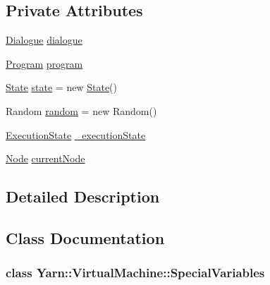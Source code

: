 \subsection*{Private Attributes}
\begin{DoxyCompactItemize}
\item 
\hyperlink{a00072}{Dialogue} \hyperlink{a00138_ac506426c503da5f033247c29e11c5e82}{dialogue}
\item 
\hyperlink{a00126}{Program} \hyperlink{a00138_a2695dbfe3d9df7ffa3f13ad2231217fb}{program}
\item 
\hyperlink{a00141}{State} \hyperlink{a00138_a70f2ce6201cdd2430ceaa764ac614ca0}{state} = new \hyperlink{a00141}{State}()
\item 
Random \hyperlink{a00138_a408485a00c7cc558428c86ed9dd04fca}{random} = new Random()
\item 
\hyperlink{a00138_add28fa9c8a45ca579e84d05920bbc42d}{Execution\-State} \hyperlink{a00138_a0ae362616d85f028b7ec3230388926f4}{\-\_\-execution\-State}
\item 
\hyperlink{a00031_dd/de2/a00320}{Node} \hyperlink{a00138_ab7594e14981ad75cecea3b2e7dcf895c}{current\-Node}
\end{DoxyCompactItemize}


\subsection{Detailed Description}


\subsection{Class Documentation}
\label{de/de9/a00322}
\hypertarget{a00138_de/de9/a00322}{}
\subsubsection{class Yarn\-:\-:Virtual\-Machine\-:\-:Special\-Variables}


